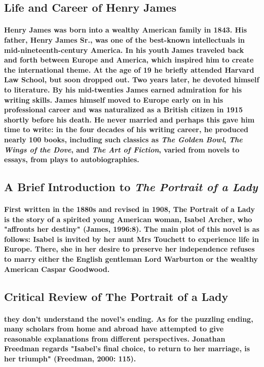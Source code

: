 \documentclass[UTF8]{ctexart}
\begin{document}
  \subsection{Life and Career of Henry James}
  \paragraph{
    \hspace{4ex}Henry James was born into a wealthy American family in 1843. His father, Henry James Sr., was one of the best-known intellectuals in mid-nineteenth-century America. In his youth James traveled back and forth between Europe and America, which inspired him to create the international theme. At the age of 19 he briefly attended Harvard Law School, but soon dropped out. Two years later, he devoted himself to literature. By his mid-twenties James earned admiration for his writing skills. James himself moved to Europe early on in his professional career and was naturalized as a British citizen in 1915 shortly before his death. He never married and perhaps this gave him time to write: in the four decades of his writing career, he produced nearly 100 books, including such classics as \emph{The Golden Bowl}, \emph{The Wings of the Dove}, and \emph{The Art of Fiction}, varied from novels to essays, from plays to autobiographies.
  }
  \subsection{A Brief Introduction to \emph{The Portrait of a Lady}}
  \paragraph{%
    \hspace{4ex}First written in the 1880s and revised in 1908, The Portrait of a Lady is the story of a spirited young American woman, Isabel Archer, who "affronts her destiny" (James, 1996:8). The main plot of this novel is as follows: Isabel is invited by her aunt Mrs Touchett to experience life in Europe. There, she in her desire to preserve her independence refuses to marry either the English gentleman Lord Warburton or the wealthy American Caspar Goodwood.
  }
  \subsection{Critical Review of The Portrait of a Lady}
  \paragraph{
    \hspace{4ex}they don’t understand the novel’s ending. As for the puzzling ending, many scholars from home and abroad have attempted to give reasonable explanations from different perspectives. Jonathan Freedman regards "Isabel's final choice, to return to her marriage, is her triumph" (Freedman, 2000: 115).
  }
\end{document}

